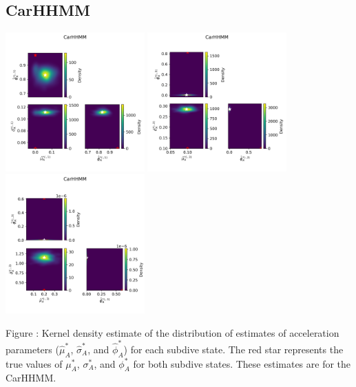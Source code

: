 \documentclass{article}
\begin{document}
        \subsection{CarHHMM}
        \begin{center}
        \includegraphics[width=2.1in]{../Plots/hhmm_V_MLE_density_A_0_0.png}
        \includegraphics[width=2.1in]{../Plots/hhmm_V_MLE_density_A_0_1.png}
        \includegraphics[width=2.1in]{../Plots/hhmm_V_MLE_density_A_0_2.png}
        \end{center}
        
        \noindent Figure : Kernel density estimate of the distribution of estimates of acceleration parameters ($\hat \mu^*_A$, $\hat \sigma^*_A$, and $\hat \phi^*_A$) for each subdive state. The red star represents the true values of $\mu^*_A$, $\sigma^*_A$, and $\phi^*_A$ for both subdive states. These estimates are for the CarHHMM. 
        \addtocounter{fignum}{1}
        
\end{document}
